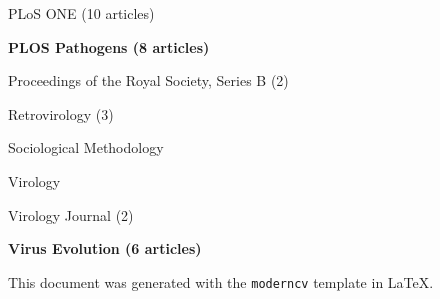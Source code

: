 \documentclass[11pt]{moderncv}
\begin{document}
{\begin{cvitemize}
\item PLoS ONE                                      (10 articles)
\item \textbf{PLOS Pathogens         (8 articles)}
\item Proceedings of the Royal Society, Series B    (2)
\item Retrovirology                                 (3)
\item Sociological Methodology                      
\item Virology                                      
\item Virology Journal                              (2)
\item \textbf{Virus Evolution           (6 articles)}
\end{cvitemize}
}

This document was generated with the \texttt{moderncv} template in \LaTeX.
\end{document}

